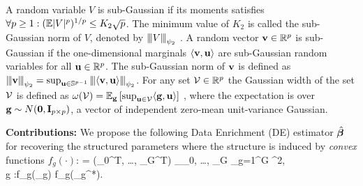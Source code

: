 A random variable $V$ is sub-Gaussian if its moments satisfies $\forall p \geq 1: (\mathbb{E} |V|^p )^{1/p} \leq K_2 \sqrt{p}$.
The minimum value of $K_2$ is called the sub-Gaussian  norm of $V$, denoted by ${\left\vert\kern-0.25ex\left\vert\kern-0.25ex\left\vert V \right\vert\kern-0.25ex\right\vert\kern-0.25ex\right\vert}_{\psi_2}$ \cite{vers12}.
A random vector $\mathbf{v} \in \mathbb R^p$ is sub-Gaussian if the one-dimensional marginals $\langle \mathbf{v}, \mathbf{u} \rangle$ are sub-Gaussian random variables for all $\mathbf{u} \in \mathbb R^p$. The sub-Gaussian norm of $\mathbf{v}$ is defined \cite{vers12} as ${\left\vert\kern-0.25ex\left\vert\kern-0.25ex\left\vert \mathbf{v} \right\vert\kern-0.25ex\right\vert\kern-0.25ex\right\vert}_{\psi_2} = \sup_{\mathbf{u} \in \mathbb S^{p-1}} {\left\vert\kern-0.25ex\left\vert\kern-0.25ex\left\vert \langle \mathbf{v}, \mathbf{u} \rangle \right\vert\kern-0.25ex\right\vert\kern-0.25ex\right\vert}_{\psi_2}$.
For any set ${\cal V} \in \mathbb R^p$ the Gaussian width of the set ${\cal V}$ is defined as $\omega({\cal V}) = \mathbb{E}_{\mathbf{g}} \left[ \sup_{\mathbf{u} \in {\cal V}} \langle \mathbf{g}, \mathbf{u} \rangle \right]$ \cite{vershynin2018high}, where the expectation is over $\mathbf{g} \sim N(\mathbf{0}, \mathbf{I}_{p \times p})$, a vector of independent zero-mean unit-variance Gaussian.



{\bf Contributions:}
We propose the following Data Enrichment (DE) estimator $\hat{\boldsymbol{\beta}}$ for recovering the structured parameters where the structure is induced by \emph{convex} functions $f_g(\cdot)$:
{\small\be
	\label{eq:super}
	\hbbe = (\hbbe_0^T, \dots, \hbbe_G^T) \in \argmin_{\bbeta _0, \dots, \bbeta _G}  \sum_{g=1}^{G} ^2,
	\\ \nr
	 \quad \forall g \in [G]:f_g(\bbeta _g) \leq f_g(\bbeta _g^*).
\ee}


